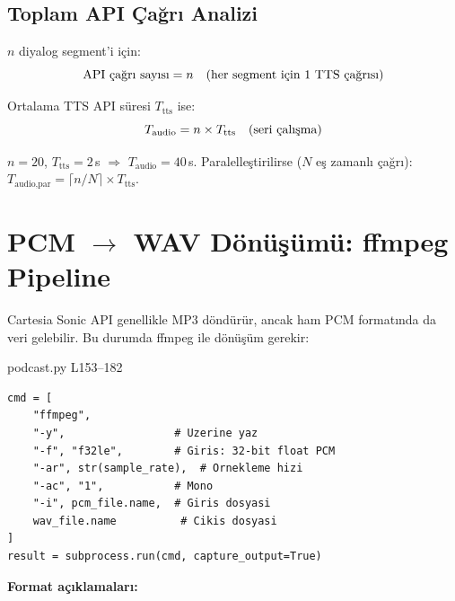 \subsection{Toplam API \c{C}a\u{g}r{\i} Analizi}

$n$ diyalog segment'i i\c{c}in:
\begin{equation}
\label{eq:api_calls}
\text{API \c{c}a\u{g}r{\i} say{\i}s{\i}} = n \quad (\text{her segment i\c{c}in 1 TTS \c{c}a\u{g}r{\i}s{\i}})
\end{equation}

Ortalama TTS API s\"{u}resi $T_{\text{tts}}$ ise:
\begin{equation}
\label{eq:tts_total_time}
T_{\text{audio}} = n \times T_{\text{tts}} \quad (\text{seri \c{c}al{\i}\c{s}ma})
\end{equation}

\begin{ornek}
$n = 20$, $T_{\text{tts}} = 2$\,s $\Rightarrow$ $T_{\text{audio}} = 40$\,s. Paralelle\c{s}tirilirse ($N$ e\c{s} zamanl{\i} \c{c}a\u{g}r{\i}): $T_{\text{audio,par}} = \lceil n/N \rceil \times T_{\text{tts}}$.
\end{ornek}


\section{PCM $\to$ WAV D\"{o}n\"{u}\c{s}\"{u}m\"{u}: ffmpeg Pipeline}
\label{sec:pcm_wav}

Cartesia Sonic API genellikle MP3 d\"{o}nd\"{u}r\"{u}r, ancak ham PCM format{\i}nda da veri gelebilir. Bu durumda ffmpeg ile d\"{o}n\"{u}\c{s}\"{u}m gerekir:

\begin{kodref}{podcast.py L153--182}
\begin{lstlisting}[caption={PCM $\to$ WAV d\"{o}n\"{u}\c{s}\"{u}m\"{u}}]
cmd = [
    "ffmpeg",
    "-y",                 # Uzerine yaz
    "-f", "f32le",        # Giris: 32-bit float PCM
    "-ar", str(sample_rate),  # Ornekleme hizi
    "-ac", "1",           # Mono
    "-i", pcm_file.name,  # Giris dosyasi
    wav_file.name          # Cikis dosyasi
]
result = subprocess.run(cmd, capture_output=True)
\end{lstlisting}
\end{kodref}

\textbf{Format a\c{c}{\i}klamalar{\i}:}

